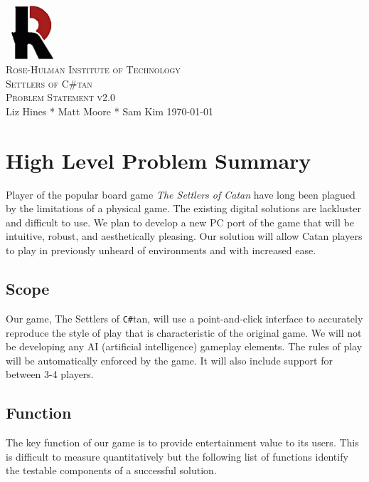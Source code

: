 \documentclass[12pt]{article}
\begin{document}
\begin{titlepage}
\begin{center}
\includegraphics[width=0.15\textwidth]{Images/logo}\\[1cm]
\textsc{\LARGE Rose-Hulman Institute of Technology}\\[1.5cm]
\textsc{\Large Settlers of C\#tan}\\[1.0cm]
\textsc{\Large Problem Statement v2.0}\\[1.0cm]
\Large Liz Hines \hspace{0.2cm}*\hspace{0.2cm}  Matt Moore \hspace{0.2cm}*\hspace{0.2cm} Sam	Kim
\vfill
\large \today
\end{center}
\end{titlepage}

\newpage
{\small \tableofcontents}
\newpage

\section{High Level Problem Summary}
Player of the popular board game \emph{The Settlers of Catan} have long been plagued by the limitations of a physical game. The existing digital solutions are lackluster and difficult to use. We plan to develop a new PC port of the game that will be intuitive, robust, and aesthetically pleasing. Our solution will allow Catan players to play in previously unheard of environments and with increased ease.

\subsection{Scope}
Our game, The Settlers of \verb!C#!tan, will use a point-and-click interface to accurately reproduce the style of play that is characteristic of the original game. We will not be developing any AI (artificial intelligence) gameplay elements. The rules of play will be automatically enforced by the game. It will also include support for between 3-4 players. 

\subsection{Function}
The key function of our game is to provide entertainment value to its users. This is difficult to measure quantitatively but the following list of functions identify the testable components of a successful solution.
\end{document}
